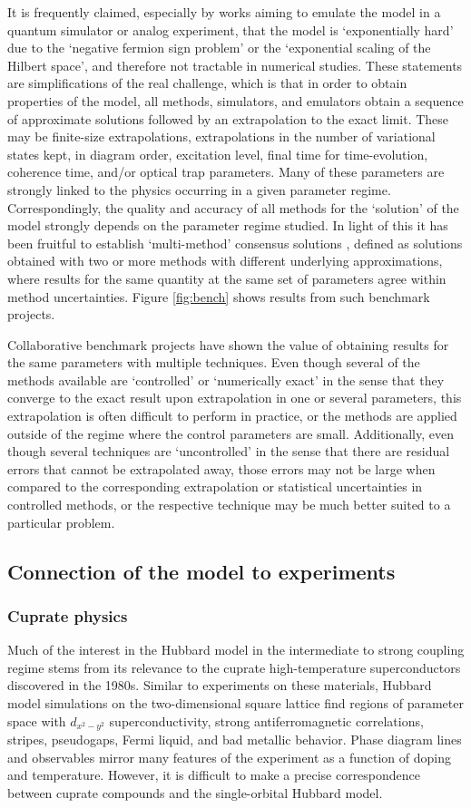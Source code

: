\documentclass{ar-1col}
\begin{document}
It is frequently claimed, especially by works aiming to emulate the model in a quantum simulator or analog experiment, that the model is `exponentially hard' due to the `negative fermion sign problem' or the `exponential scaling of the Hilbert space', and therefore not tractable in numerical studies. These statements are simplifications of the real challenge, which is that in order to obtain properties of the model, all methods, simulators, and emulators obtain a sequence of approximate solutions followed by an extrapolation to the exact limit. These may be finite-size extrapolations, extrapolations in the number of variational states kept, in diagram order, excitation level, final time for time-evolution, coherence time, and/or optical trap parameters. Many of these parameters are strongly linked to the physics occurring in a given parameter regime. Correspondingly, the quality and accuracy of all methods for the `solution' of the model strongly depends on the parameter regime studied. In light of this it has been fruitful to establish `multi-method' consensus solutions \cite{LeBlanc15,Schaefer21A}, defined as solutions obtained with two or more methods with different underlying approximations, where results for the same quantity at the same set of parameters agree within method uncertainties. Figure \ref{fig:bench} shows results from such benchmark projects.

Collaborative benchmark projects have shown the value of obtaining results for the same parameters with multiple techniques. Even though several of the methods available are `controlled' or `numerically exact' in the sense that they converge to the exact result upon extrapolation in one or several parameters, this extrapolation is often difficult to perform in practice, or the methods are applied outside of the regime where the control parameters are small. Additionally, even though several techniques are `uncontrolled' in the sense that there are residual errors that cannot be extrapolated away, those errors may not be large when compared to the corresponding extrapolation or statistical uncertainties in controlled methods, or the respective technique may be much better suited to a particular problem. 
\subsection{Connection of the model to experiments}
\subsubsection{Cuprate physics}
Much of the interest in the Hubbard model in the intermediate to strong coupling regime stems from its relevance to the cuprate high-temperature superconductors discovered in the 1980s. Similar to experiments on these materials, Hubbard model simulations on the two-dimensional square lattice find regions of parameter space with $d_{x^2-y^2}$ superconductivity, strong antiferromagnetic correlations, stripes, pseudogaps, Fermi liquid, and bad metallic behavior. Phase diagram lines and observables mirror many features of the experiment as a function of doping and temperature.
However, it is difficult to make a precise correspondence between cuprate compounds and the single-orbital Hubbard model.
\end{document}
